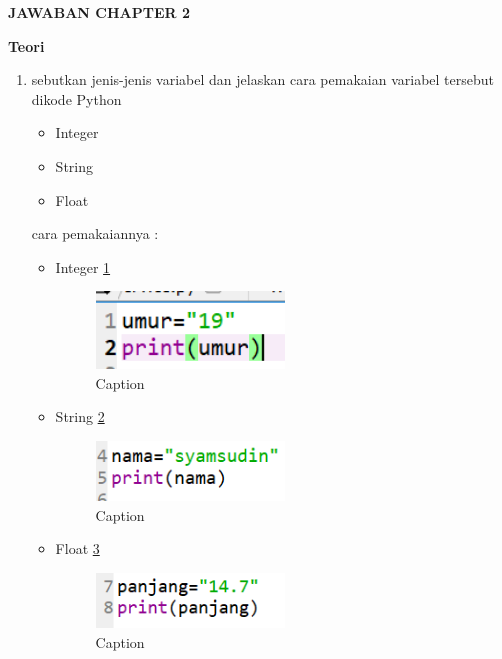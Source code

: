 \item \textbf{JAWABAN CHAPTER 2} 
\par
\textbf{Teori}
\begin{enumerate}
    \item  sebutkan jenis-jenis variabel dan jelaskan cara pemakaian variabel tersebut dikode Python
    \begin{itemize}
        \item Integer
        \item String
        \item Float
    \end{itemize}
    cara pemakaiannya :
    \begin{itemize}
        \item Integer \ref{capture19}
        \begin{figure} [htbp!]
            \centering
            \includegraphics[width=5cm]{figures/Capture19.PNG}
            \caption{Caption}
            \label{capture19}
        \end{figure}
        
        \item String \ref{capture20}
        \begin{figure} [htbp!]
            \centering
            \includegraphics[width=5cm]{figures/Capture20.PNG}
            \caption{Caption}
            \label{capture20}
        \end{figure}
        
        \item Float \ref{capture21}
        \begin{figure} [htbp!]
            \centering
            \includegraphics[width=5cm]{figures/Capture21.PNG}
            \caption{Caption}
            \label{capture21}
        \end{figure}
    \end{itemize}
    

\end{enumerate}
